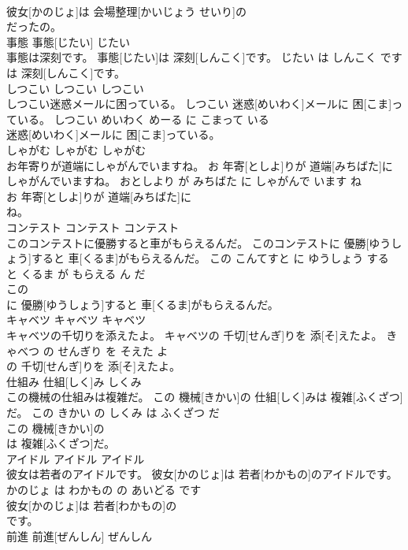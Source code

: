 \documentclass[8pt]{extreport}
\begin{document}
\begin{CJK}{UTF8}{min}
\\	彼女[かのじょ]は 会場整理[かいじょう せいり]の
\\	だったの。			
\\	事態	事態[じたい]	じたい	
\\	事態は深刻です。	事態[じたい]は 深刻[しんこく]です。	じたい は しんこく です	
\\	は 深刻[しんこく]です。			
\\	しつこい	しつこい	しつこい	
\\	しつこい迷惑メールに困っている。	しつこい 迷惑[めいわく]メールに 困[こま]っている。	しつこい めいわく めーる に こまって いる	
\\	迷惑[めいわく]メールに 困[こま]っている。			
\\	しゃがむ	しゃがむ	しゃがむ	
\\	お年寄りが道端にしゃがんでいますね。	お 年寄[としよ]りが 道端[みちばた]にしゃがんでいますね。	おとしより が みちばた に しゃがんで います ね	
\\	お 年寄[としよ]りが 道端[みちばた]に
\\	ね。			
\\	コンテスト	コンテスト	コンテスト	
\\	このコンテストに優勝すると車がもらえるんだ。	このコンテストに 優勝[ゆうしょう]すると 車[くるま]がもらえるんだ。	この こんてすと に ゆうしょう する と くるま が もらえる ん だ	
\\	この
\\	に 優勝[ゆうしょう]すると 車[くるま]がもらえるんだ。			
\\	キャベツ	キャベツ	キャベツ	
\\	キャベツの千切りを添えたよ。	キャベツの 千切[せんぎ]りを 添[そ]えたよ。	きゃべつ の せんぎり を そえた よ	
\\	の 千切[せんぎ]りを 添[そ]えたよ。			
\\	仕組み	仕組[しく]み	しくみ	
\\	この機械の仕組みは複雑だ。	この 機械[きかい]の 仕組[しく]みは 複雑[ふくざつ]だ。	この きかい の しくみ は ふくざつ だ	
\\	この 機械[きかい]の
\\	は 複雑[ふくざつ]だ。			
\\	アイドル	アイドル	アイドル	
\\	彼女は若者のアイドルです。	彼女[かのじょ]は 若者[わかもの]のアイドルです。	かのじょ は わかもの の あいどる です	
\\	彼女[かのじょ]は 若者[わかもの]の
\\	です。			
\\	前進	前進[ぜんしん]	ぜんしん	

\end{CJK}
\end{document}

